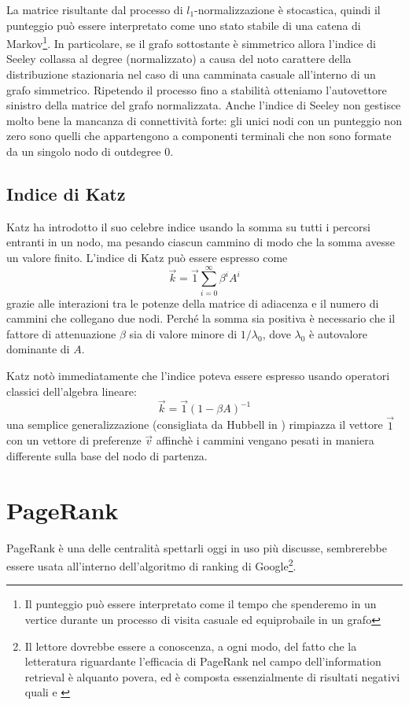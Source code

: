 La matrice risultante dal processo di $l_1$-normalizzazione è stocastica, quindi il punteggio può essere interpretato come uno stato stabile di una catena di Markov\footnote{Il punteggio può essere interpretato come il tempo che spenderemo in un vertice durante un processo di visita casuale ed equiprobaile in un grafo}. In particolare, se il grafo sottostante è simmetrico allora l'indice di Seeley collassa al degree (normalizzato) a causa del noto carattere della distribuzione stazionaria nel caso di una camminata casuale all'interno di un grafo simmetrico. Ripetendo il processo fino a stabilità otteniamo l'autovettore sinistro della matrice del grafo normalizzata.
Anche l'indice di Seeley non gestisce molto bene la mancanza di connettività forte: gli unici nodi con un punteggio non zero sono quelli che appartengono a componenti terminali che non sono formate da un singolo nodo di outdegree 0.
\subsection{Indice di Katz}
Katz ha introdotto il suo celebre indice \cite{katz} usando la somma su tutti i percorsi entranti in un nodo, ma pesando ciascun cammino di modo che la somma avesse un valore finito. L'indice di Katz può essere espresso come
\begin{equation}
    \vec{k} = \vec{1} \sum_{i = 0}^{\infty}{\beta^i A^i}
\end{equation}
grazie alle interazioni tra le potenze della matrice di adiacenza e il numero di cammini che collegano due nodi. Perché la somma sia positiva è necessario che il fattore di attenuazione $\beta$ sia di valore minore di $1 / \lambda_0$, dove $\lambda_0$ è autovalore dominante di $A$.

Katz notò immediatamente che l'indice poteva essere espresso usando operatori classici dell'algebra lineare:
\begin{equation}
    \vec{k} = \vec{1}(1 - \beta A)^{-1}
\end{equation}
una semplice generalizzazione (consigliata da Hubbell in \cite{hub}) rimpiazza il vettore $\vec{1}$ con un vettore di preferenze $\vec{v}$ affinchè i cammini vengano pesati in maniera differente sulla base del nodo di partenza.
\section{PageRank}
PageRank è una delle centralità spettarli oggi in uso più discusse, sembrerebbe essere usata all'interno dell'algoritmo di ranking di Google\footnote{Il lettore dovrebbe essere a conoscenza, a ogni modo, del fatto che la letteratura riguardante l'efficacia di PageRank nel campo dell'information retrieval è alquanto povera, ed è composta essenzialmente di risultati negativi quali \cite{prank} e \cite{prankoind}}.

